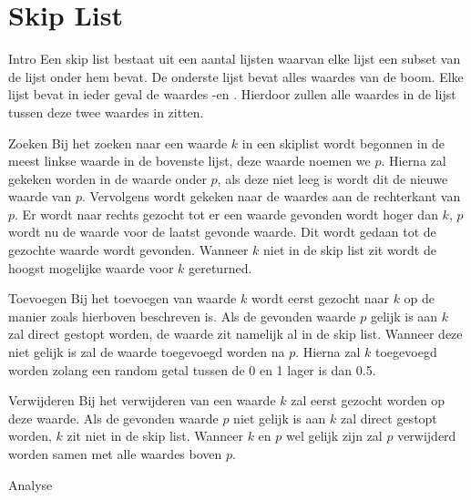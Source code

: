 \chapter{Skip List}
\label{sec:Hoofdstuk 6}

Intro
Een skip list bestaat uit een aantal lijsten waarvan elke lijst een subset van de lijst onder hem bevat. De onderste lijst bevat alles waardes van de boom. Elke lijst bevat in ieder geval de waardes -\infty en \infty. Hierdoor zullen alle waardes in de lijst tussen deze twee waardes in zitten.

Zoeken
Bij het zoeken naar een waarde $k$ in een skiplist wordt begonnen in de meest linkse waarde in de bovenste lijst, deze waarde noemen we $p$. Hierna zal gekeken worden in de waarde onder $p$, als deze niet leeg is wordt dit de nieuwe waarde van $p$. Vervolgens wordt gekeken naar de waardes aan de rechterkant van $p$. Er wordt naar rechts gezocht tot er een waarde gevonden wordt hoger dan $k$, $p$ wordt nu de waarde voor de laatst gevonde waarde. Dit wordt gedaan tot de gezochte waarde wordt gevonden. Wanneer $k$ niet in de skip list zit wordt de hoogst mogelijke waarde voor $k$ gereturned.

Toevoegen
Bij het toevoegen van waarde $k$ wordt eerst gezocht naar $k$ op de manier zoals hierboven beschreven is. Als de gevonden waarde $p$ gelijk is aan $k$ zal direct gestopt worden, de waarde zit namelijk al in de skip list. Wanneer deze niet gelijk is zal de waarde toegevoegd worden na $p$. Hierna zal $k$ toegevoegd worden zolang een random getal tussen de 0 en 1 lager is dan 0.5.

Verwijderen
Bij het verwijderen van een waarde $k$ zal eerst gezocht worden op deze waarde. Als de gevonden waarde $p$ niet gelijk is aan $k$ zal direct gestopt worden, $k$ zit niet in de skip list. Wanneer $k$ en $p$ wel gelijk zijn zal $p$ verwijderd worden samen met alle waardes boven $p$.

Analyse

